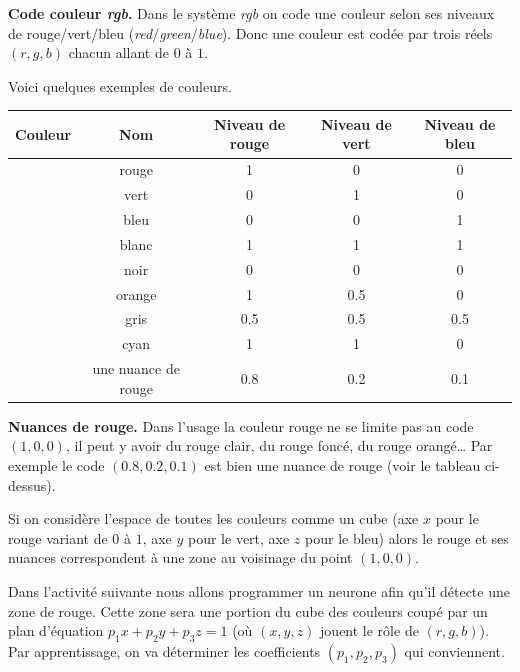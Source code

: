 \documentclass[11pt,class=report,crop=false]{standalone}
\begin{document}
\begin{cours}[Couleurs]
	
	
\textbf{Code couleur \emph{rgb}.}
Dans le système \emph{rgb} on code une couleur selon ses niveaux de rouge/vert/bleu (\emph{red}/\emph{green}/\emph{blue}). Donc une couleur est codée par trois réels $(r,g,b)$ 
chacun allant de $0$ à $1$.


Voici quelques exemples de couleurs.

\begin{center}
	\begin{tabular}{|c|c|c|c|c|}
		\hline
		Couleur & Nom & Niveau de rouge & Niveau de vert & Niveau de bleu \\ \hline
		\cellcolor{red}  & rouge  & 1 & 0 & 0 \\ \hline
		\cellcolor{green}& vert  & 0 & 1 & 0 \\ \hline
		\cellcolor{blue} & bleu   & 0 & 0 & 1 \\ \hline
		\cellcolor{white} & blanc  & 1 & 1 & 1  \\ \hline
		\cellcolor{black} & noir   & 0 & 0 & 0  \\ \hline
		\cellcolor{myorange} & orange & 1 & 0.5 & 0  \\ \hline  
		\cellcolor{mygray}& gris   & 0.5 & 0.5 & 0.5 \\ \hline
		\cellcolor{mycyan}& cyan   & 1 & 1 & 0 \\ \hline
		\cellcolor{myred}& une nuance de rouge   & 0.8 & 0.2 & 0.1 \\ \hline
	\end{tabular}
\end{center}

\medskip

\textbf{Nuances de rouge.}
Dans l'usage la couleur rouge ne se limite pas au code $(1,0,0)$, il peut y avoir du rouge clair, du rouge foncé, du rouge orangé\ldots{} Par exemple le code $(0.8,0.2,0.1)$ est bien une nuance de rouge (voir le tableau ci-dessus).

Si on considère l'espace de toutes les couleurs comme un cube (axe $x$ pour le rouge variant de $0$ à $1$, axe $y$ pour le vert, axe $z$ pour le bleu) alors le rouge et ses nuances correspondent à une zone au voisinage du point $(1,0,0)$.


Dans l'activité suivante nous allons programmer un neurone afin qu'il détecte une zone de rouge.
Cette zone sera une portion du cube des couleurs coupé par un plan d'équation $p_1 x+ p_2 y + p_3 z = 1$
(où $(x,y,z)$ jouent le rôle de $(r,g,b)$). Par apprentissage, on va déterminer les coefficients $(p_1,p_2,p_3)$ qui conviennent.



\end{cours}
\end{document}
